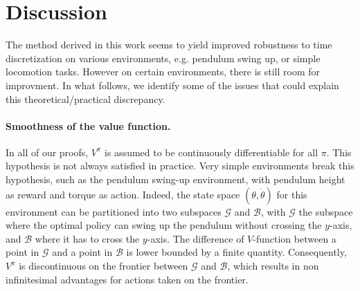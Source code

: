 \section{Discussion}
\label{sec:discussions}

The method derived in this work seems to yield improved robustness to
time discretization on various environments, e.g. pendulum swing up, or
simple locomotion tasks.  However on certain environments, there is still
room for improvment. In what follows, we identify some of the issues
that could explain this theoretical/practical discrepancy.

\paragraph{Smoothness of the value function.} In all of our proofs, $V^\pi$ is
assumed to be continuously differentiable for all $\pi$.  This %
hypothesis is not always satisfied in practice. Very simple environments
break this hypothesis, such as the pendulum swing-up environment,
with pendulum height as reward and torque as action.  Indeed, 
the state space $(\theta, \dot{\theta})$ for this environment
can be partitioned into two subspaces $\mathcal{G}$ and $\mathcal{B}$, with
$\mathcal{G}$ the subspace where the optimal policy 
can swing up the pendulum without crossing the $y$-axis, and $\mathcal{B}$ where
it has to cross the $y$-axis. The difference of $V$-function between a point in
$\mathcal{G}$ and a point in $\mathcal{B}$ is lower bounded by a finite
quantity. 
Consequently, $V^\pi$ is
discontinuous on the frontier between $\mathcal{G}$ and $\mathcal{B}$, which results in non infinitesimal advantages
for actions taken on the frontier. 

